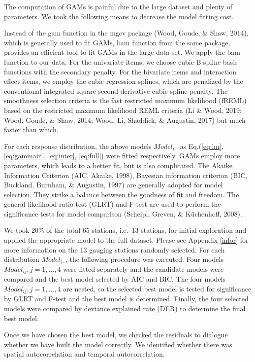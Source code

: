 \documentclass[12pt,oneside]{reedthesis}
\begin{document}
The computation of GAMs is painful due to the large dataset and plenty of parameters. We took the following means to decrease the model fitting cost.

Instead of the gam function in the mgcv package (Wood, Goude, \& Shaw, 2014), which is generally used to fit GAMs, bam function from the same package, provides an efficient tool to fit GAMs in the large data set. We apply the bam function to our data. For the univariate items, we choose cubic B-spline basis functions with the secondary penalty. For the bivariate items and interaction effect items, we employ the cubic regression splines, which are penalized by the conventional integrated square second derivative cubic spline penalty. The smoothness selection criteria is the fast restricted maximum likelihood (fREML) based on the restricted maximum likelihood REML criteria (Li \& Wood, 2019; Wood, Goude, \& Shaw, 2014; Wood, Li, Shaddick, \& Augustin, 2017) but much faster than which.

For each response distribution, the above models \(Model_{i\cdot}\) as Eq.(\ref{eq:lm}, \ref{eq:gammain}, \ref{eq:inter}, \ref{eq:full}) were fitted respectively. GAMs employ more parameters, which leads to a better fit, but is also complicated. The Akaike Information Criterion (AIC, Akaike, 1998), Bayesian information criterion (BIC, Buckland, Burnham, \& Augustin, 1997) are generally adopted for model selection. They strike a balance between the goodness of fit and freedom. The general likelihood ratio test (GLRT) and F-test are used to perform the significance tests for model comparison (Scheipl, Greven, \& Küchenhoff, 2008).

We took 20\% of the total 65 stations, i.e.~13 stations, for initial exploration and applied the appropriate model to the full dataset. Please see Appendix \ref{infor} for more information on the 13 gauging stations randomly selected. For each distribution \(Model_{i\cdot}\), the following procedure was executed. Four models \(Model_{ij},j=1,\dots,4\) were fitted separately and the candidate models were compared and the best model selected by AIC and BIC. The four models \(Model_{ij},j=1,\dots,4\) are nested, so the selected best model is tested for significance by GLRT and F-test and the best model is determined. Finally, the four selected models were compared by deviance explained rate (DER) to determine the final best model.

Once we have chosen the best model, we checked the residuals to dialogue whether we have built the model correctly. We identified whether there was spatial autocorrelation and temporal autocorrelation.
\end{document}
